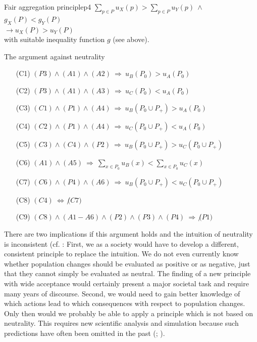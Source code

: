 \begin{Premise}{Fair aggregation principle}{p4}
  \hspace*{.5cm} $
    \sum_{p\in P} u_X(p) > \sum_{p\in P} u_Y(p) \ \wedge
  $ \\
  \hspace*{.5cm} $g_X(P) < g_Y(P)
  $ \\
  $
    \rightarrow u_X(P) > u_Y(P)
  $ \\
  with suitable inequality function $g$ (see above).
\end{Premise}

\begin{Proof}{The argument against neutrality}{}
\begin{enumerate}
\item[(C1)]
$(P3) \wedge (A1) \wedge (A2) \ \Rightarrow \ u_B(P_0) > u_A(P_0)$
\item[(C2)]
$(P3) \wedge (A1) \wedge (A3) \ \Rightarrow \ u_C(P_0) < u_A(P_0)$
\item[(C3)]
$(C1) \wedge (P1) \wedge (A4) \ \Rightarrow \ u_B(P_0 \cup P_+) > u_A(P_0)$
\item[(C4)]
$(C2) \wedge (P1) \wedge (A4) \ \Rightarrow \ u_C(P_0 \cup P_+) < u_A(P_0)$
\item[(C5)]
$(C3) \wedge (C4) \wedge (P2) \ \Rightarrow \ u_B(P_0 \cup P_+) > u_C(P_0 \cup P_+)$
\item[(C6)]
$(A1) \wedge (A5) \ \Rightarrow \ \sum_{x\in P_0} u_B(x) < \sum_{x \in P_0} u_C(x)$
\item[(C7)]
$(C6) \wedge (P4) \wedge (A6) \ \Rightarrow  \ u_B(P_0 \cup P_+) < u_C(P_0 \cup P_+)$
\item[(C8)]
$(C4) \ \Leftrightarrow \ \not (C7)$
\item[(C9)]
$(C8) \wedge (A1-A6) \wedge (P2) \wedge (P3) \wedge (P4) \ \Rightarrow \ \not (P1)$
\end{enumerate}
\end{Proof}

There are two implications if this argument holds and the intuition of neutrality is inconsistent (cf. : First, we as a society would have to develop a different, consistent principle to replace the intuition. We do not even currently know whether population changes should be evaluated as positive or as negative, just that they cannot simply be evaluated as neutral. The finding of a new principle with wide acceptance would certainly present a major societal task and require many years of discourse. Second, we would need to gain better knowledge of which actions lead to which consequences with respect to population changes. Only then would we probably be able to apply a principle which is not based on neutrality. This requires new scientific analysis and simulation because such predictions have often been omitted in the past (; ). 

